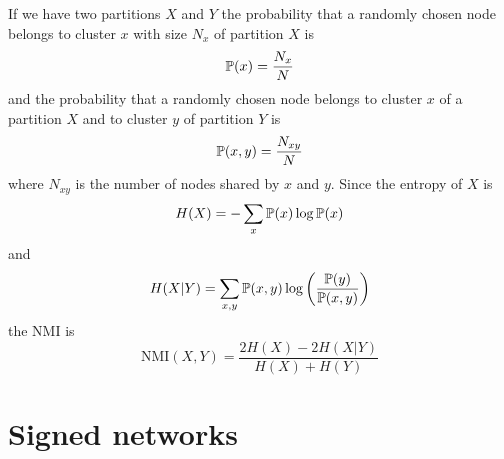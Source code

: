 \documentclass[a4paper,9pt]{extarticle}
\begin{document}
\begin{multicols*}{2}
\begin{riquadro}
		\end{riquadro}
		If we have two partitions $X$ and $Y$ the probability that a randomly chosen node belongs to cluster $x$ with size $N_{x}$ of partition $X$ is
		\begin{equation*}
			\mathbb{P}(x)=\frac{N_{x}}{N}
		\end{equation*}
		and the probability that a randomly chosen node belongs to cluster $x$ of a partition $X$ and to cluster $y$ of partition $Y$ is
		\begin{equation*}
			\mathbb{P}(x,y)=\frac{N_{xy}}{N}
		\end{equation*}
		where $N_{xy}$ is the number of nodes shared by $x$ and $y$. Since the entropy of $X$ is
		\begin{equation*}
			H(X)=-\sum_{x}\mathbb{P}(x)\log\mathbb{P}(x)
		\end{equation*}
		and
		\begin{equation*}
			H(X|Y)=\sum_{x,y}\mathbb{P}(x,y)\log\left(\frac{\mathbb{P}(y)}{\mathbb{P}(x,y)}\right)
		\end{equation*}
		the NMI is
		\begin{equation*}
			\mathrm{NMI}(X,Y)=\frac{2H(X)-2H(X|Y)}{H(X)+H(Y)}
		\end{equation*}
		\section{Signed networks}

\end{multicols*}
\end{document}
